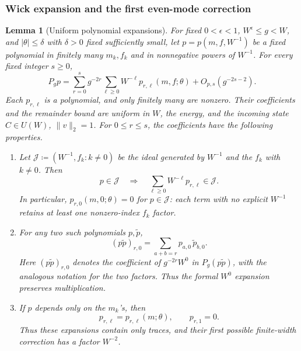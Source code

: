 \documentclass[11pt]{article}
\numberwithin{equation}{section}
\newtheorem{lemma}[theorem]{Lemma}
\theoremstyle{remark}
\begin{document}
\subsubsection{Wick expansion and the first even-mode correction}
\begin{lemma}[Uniform polynomial expansions]\label{lg:lem:ideal}
For fixed $0<\epsilon<1$, $W^\epsilon\le g<W$, and $|\theta|\le\delta$ with $\delta>0$ fixed sufficiently small,
let $p=p(m,f,W^{-1})$ be a fixed polynomial in finitely many
$m_k,f_k$ and in nonnegative powers of $W^{-1}$.
For every fixed integer $s\ge0$,
\[
 P_gp=\sum_{r=0}^{s}g^{-2r}\sum_{\ell\ge0}W^{-\ell}
             p_{r,\ell}(m,f;\theta)+O_{p,s}(g^{-2s-2}).
\]
Each $p_{r,\ell}$ is a polynomial, and only finitely many are
nonzero. Their coefficients and the remainder bound are uniform
in $W$, the energy, and the incoming state
$C\in U(W)$, $\|v\|_2=1$. For $0\le r\le s$, the coefficients
have the following properties.
\begin{enumerate}
\item[(i)] Let $\mathscr J\coloneqq(W^{-1},f_k:k\ne0)$ be the ideal generated
by $W^{-1}$ and the $f_k$ with $k\ne0$. Then
\[
 p\in\mathscr J\quad\Longrightarrow\quad
 \sum_{\ell\ge0}W^{-\ell}p_{r,\ell}\in\mathscr J.
\]
In particular, $p_{r,0}(m,0;\theta)=0$ for $p\in\mathscr J$:
each term with no explicit $W^{-1}$ retains at least one
nonzero-index $f_k$ factor.
\item[(ii)] For any two such polynomials $p,\widetilde p$,
\[
 (p\widetilde p)_{r,0}
   =\sum_{a+b=r}p_{a,0}\,\widetilde p_{b,0}.
\]
Here $(p\widetilde p)_{r,0}$ denotes the coefficient of
$g^{-2r}W^0$ in $P_g(p\widetilde p)$, with the analogous
notation for the two factors. Thus the formal $W^0$ expansion
preserves multiplication.
\item[(iii)] If $p$ depends only on the $m_k$'s, then
\[
 p_{r,\ell}=p_{r,\ell}(m;\theta),\qquad p_{r,1}=0.
\]
Thus these expansions contain only traces, and their first
possible finite-width correction has a factor $W^{-2}$.
\end{enumerate}
\end{lemma}
\end{document}
